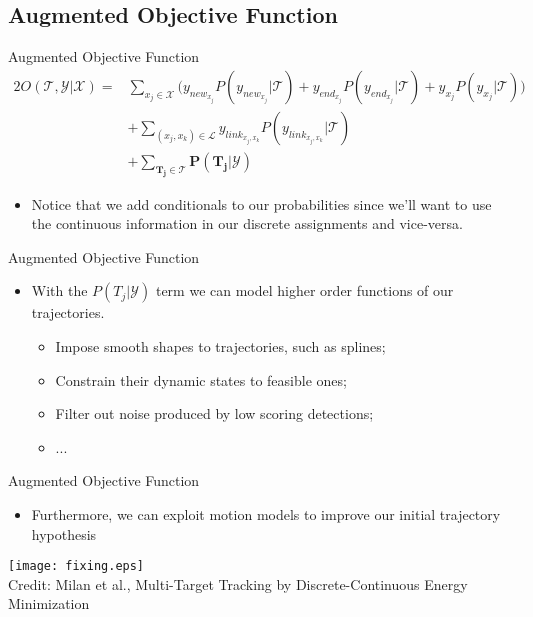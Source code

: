 \subsection{Augmented Objective Function}
\begin{frame}{Augmented Objective Function}
	\begin{alignat*}{2}
		\label{eq:linear_problem}
		 O(\mathcal{T}, \mathcal{Y}|\mathcal{X}) = & \sum_{x_j \in \mathcal{X}} \Bigg( y_{new_{x_j}} P(y_{new_{x_j}}|\mathcal{T}) + y_{end_{x_j}} P(y_{end_{x_j}}|\mathcal{T}) + y_{x_j} P(y_{x_j}|\mathcal{T}) \Bigg)                                         \\
		 & + \sum_{(x_j,x_k)\in \mathcal{L}}y_{link_{x_j,x_k}}P(y_{link_{x_j,x_k}}|\mathcal{T})\\
		 & + \mathbf{\sum_{T_j \in \mathcal{T}} P(T_j|\mathcal{Y})}
	 \end{alignat*}
	 \begin{itemize}
	 	\item Notice that we add conditionals to our probabilities since we'll want to use the continuous information in our discrete assignments and vice-versa.
	 \end{itemize}
\end{frame}



\begin{frame}{Augmented Objective Function}
\begin{itemize}
	\item With the $P(T_j|\mathcal{Y})$ term we can model higher order functions of our trajectories.
	\begin{itemize}
		\item Impose smooth shapes to trajectories, such as splines;
		\item Constrain their dynamic states to feasible ones;
		\item Filter out noise produced by low scoring detections;
		\item ...
	\end{itemize}
\end{itemize}
\end{frame}



\begin{frame}{Augmented Objective Function}
\begin{itemize}
	\item Furthermore, we can exploit motion models to improve our initial trajectory hypothesis
\end{itemize}
\begin{center}
	\texttt{[image: fixing.eps]}\\[-1ex]
	{\tiny Credit: Milan et al., Multi-Target Tracking by Discrete-Continuous Energy Minimization}
\end{center}
\end{frame}


